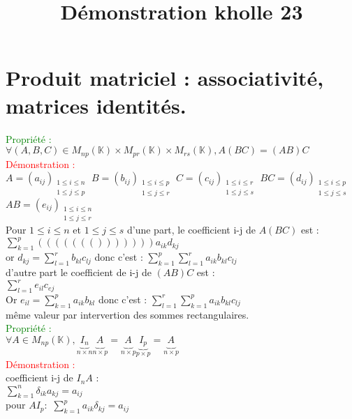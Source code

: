 \documentclass{article}
\begin{document}
\title{Démonstration kholle 23}
\date{}
\maketitle
	\renewcommand{\thesection}{\Roman{section}}
	\setlength{\parindent}{1.5cm}
	\section{ Produit matriciel : associativité, matrices identités.}
	\textcolor{green}{Propriété :}
	$\forall (A,B,C) \in M_{np}(\mathbb K) \times M_{pr}(\mathbb K) \times M_{rs}(\mathbb K), A(BC)=(AB)C$ \\
	\textcolor{red}{Démonstration :} \\
	$A=(a_{ij}){}_{\substack{1\leq i\leq n \\ 1\leq j\leq p}}$
	$B=(b_{ij}){}_{\substack{1\leq i\leq p \\ 1\leq j\leq r}}$
	 $C=(c_{ij}){}_{\substack{1\leq i\leq r \\ 1\leq j\leq s}}$
	 $BC=(d_{ij}){}_{\substack{1\leq i\leq p \\ 1\leq j\leq s}}$
	 $AB=(e_{ij}){}_{\substack{1\leq i\leq n \\ 1\leq j\leq r}}$ \\
	 Pour $1 \leq i \leq n$ et $1 \leq j \leq s$ d'une part, le coefficient i-j de $A(BC)$ est :\\
	  $\sum_{k=1}^p((((((())))))) a_{ik}d_{kj}$ \\
	 or $d_{kj}= \sum_{l=1}^r b_{kl} c_{lj}$ donc c'est : $\sum_{k=1}^p \sum_{l=1}^r a_{ik}b_{kl}c_{lj}$ \\
	 d'autre part le coefficient de i-j de $(AB)C$ est : \\
	 $\sum_{l=1}^r e_{il}c_{ej}$ \\
	 Or $e_{il}= \sum_{k=1}^p a_{ik} b_{kl}$ donc c'est : $\sum_{l=1}^r \sum_{k=1}^p a_{ik} b_{kl} c_{lj}$ \\
	 même valeur par intervertion des sommes rectangulaires. \\
	 \textcolor{green}{Propriété :} \\
	 $\forall A \in M_{np}(\mathbb K), \underbrace{I_n}_{n \times n} \underbrace{A_{}}_{n \times p} = \underbrace{A_{}}_{n \times p} \underbrace{I_p}_{p \times p} = \underbrace{A_{}}_{n \times p} $ \\
	 \textcolor{red}{Démonstration :} \\
	 coefficient  i-j de $I_nA$ : \\
	 $\sum_{k=1}^n \delta_{ik}a_{kj}=a_{ij}$ \\
	 pour $A I_p :$ $\sum_{k=1}^p a_{ik} \delta_{kj}=a_{ij}$
\end{document}
